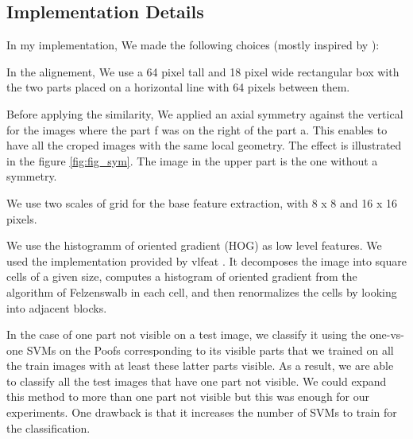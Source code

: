 \documentclass[twoside]{article}
\begin{document}
\begin{multicols}{2}
\section{Implementation Details}

In my implementation, We made the following choices (mostly inspired by \cite{poof}):

\begin{compactitem}
	\item In the alignement, We use a 64 pixel tall and 18 pixel wide rectangular box with the two parts placed on a horizontal line with 64 pixels between them.
	\item Before applying the similarity, We applied an axial symmetry against the vertical for the images where the part f was on the right of the part a. This enables to have all the croped images with the same local geometry. The effect is illustrated in the figure \ref{fig:fig_sym}. The image in the upper part is the one without a symmetry.
	\item We use two scales of grid for the base feature extraction, with 8 x 8 and 16 x 16 pixels.
	\item We use the histogramm of oriented gradient (HOG) as low level features. We used the implementation provided by vlfeat \cite{vlf}.  It decomposes the image into square cells of a given size, computes a histogram of oriented gradient from the algorithm of  Felzenswalb \cite{fel} in each cell, and then renormalizes the cells by looking into adjacent blocks.
	\item In the case of one part not visible on a test image, we classify it using the one-vs-one SVMs on the Poofs corresponding to its visible parts that we trained on all the train images with at least these latter parts visible. As a result, we are able to classify all the test images that have one part not visible. We could expand this method to more than one part not visible but this was enough for our experiments. One drawback is that it increases the number of SVMs to train for the classification.
\end{compactitem}


\end{multicols}
\end{document}
